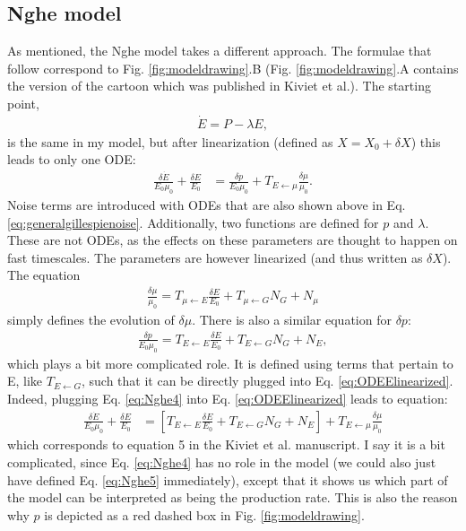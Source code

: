 \subsection*{Nghe model}

As mentioned, the Nghe model takes a different approach. 
The formulae that follow correspond to Fig. \ref{fig:modeldrawing}.B (Fig. \ref{fig:modeldrawing}.A contains the version of the cartoon which was published in Kiviet et al.).
The starting point,
%
\begin{align}
\label{eq:Nghe1}
\dot{E} = P - \lambda E
,
\end{align}
%
is the same in my model, but after linearization (defined as $X=X_0+\delta X$) this leads to only one ODE:
%
\begin{align}
\label{eq:ODEElinearized}
\frac{ \delta{\dot{E}} }{E_0 \mu_0} 
+ \frac{\delta E}{E_0} 
& =
\frac{\delta p}{E_0 \mu_0} + T_{E \leftarrow \mu} \frac{\delta \mu}{\mu_0}
.
\end{align}
%
Noise terms are introduced with ODEs that are also shown above in Eq. \ref{eq:generalgillespienoise}.
 Additionally, two functions are defined for $p$ and $\lambda$. These are not ODEs, as the effects on these parameters are thought to happen on fast timescales. The parameters are however linearized (and thus written as $\delta X$). The equation
%
\begin{align}
\label{eq:Nghe3}
\frac{\delta\mu}{\mu_0} = T_{\mu \leftarrow E} \frac{\delta E}{E_0} + T_{\mu \leftarrow G} N_G + N_\mu
\end{align}
%
simply defines the evolution of $\delta \mu$.
There is also a similar equation for $\delta p$:
%
\begin{align}
\label{eq:Nghe4}
\frac{\delta{p}}{E_0 \mu_0} = T_{E \leftarrow E} \frac{\delta E}{E_0} + T_{E \leftarrow G} N_G + N_E
,
\end{align}
%
which plays a bit more complicated role.
It is defined using terms that pertain to E, like $T_{E \leftarrow G}$, such that it can be directly plugged into Eq. \ref{eq:ODEElinearized}. 
Indeed, plugging Eq. \ref{eq:Nghe4} into Eq. \ref{eq:ODEElinearized} leads to equation:
%
\begin{align}
\label{eq:Nghe5}
\frac{ \delta{\dot{E}} }{E_0 \mu_0} 
+ \frac{\delta E}{E_0} 
& = 
\left[
 T_{E \leftarrow E} \frac{\delta E}{E_0} + T_{E \leftarrow G} N_G + N_E 
 \right]
 + T_{E \leftarrow \mu} \frac{\delta \mu}{\mu_0} 
\end{align}
%
which corresponds to equation 5 in the Kiviet et al. \cite{Kiviet2014} manuscript.
I say it is a bit complicated, since Eq. \ref{eq:Nghe4} has no role in the model (we could also just have defined Eq. \ref{eq:Nghe5} immediately), except that it shows us which part of the model can be interpreted as being the production rate.
This is also the reason why $p$ is depicted as a red dashed box in Fig. \ref{fig:modeldrawing}.


